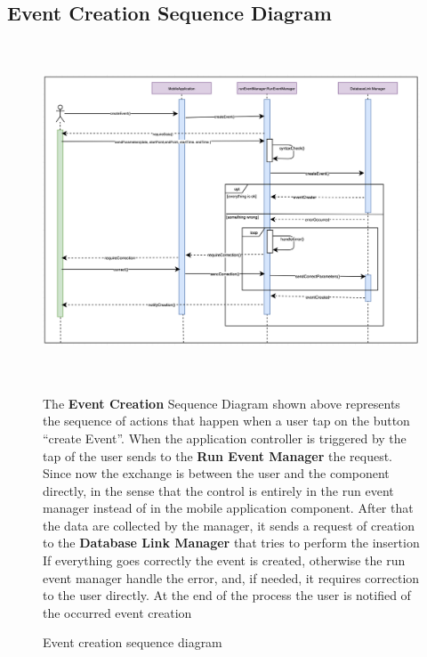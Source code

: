 \documentclass[DD.tex]{subfiles}
\begin{document}
\subsection{Event Creation Sequence Diagram}
\begin{figure}[h!]
\centering
\includegraphics[height=10.00cm,keepaspectratio]{Figures/EventCreation}
\caption{Event creation sequence diagram}

The \textbf{Event Creation} Sequence Diagram shown above represents the sequence of actions that happen when a user tap on the button “create Event”.
When the application controller is triggered by the tap of the user sends to the \textbf{Run Event Manager} the request.
Since now the exchange is between the user and the component directly, in the sense that the control is entirely in the run event manager instead of in the mobile application component.
After that the data are collected by the manager, it sends a request of creation to the \textbf{Database Link Manager }that tries to perform the insertion
If everything goes correctly the event is created, otherwise the run event manager handle the error, and, if needed, it requires correction to the user directly.
At the end of the process the user is notified of the occurred event creation
	
\end{figure}

\newpage
\end{document}
